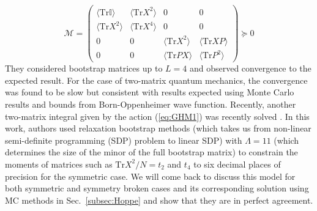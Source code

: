 \documentclass[letter,11pt]{article}
\begin{document}
\begin{equation}
	\mathcal{M} = 
	\begin{pmatrix}
		\langle \mbox{Tr}\mathbb{I} \rangle & \langle \mbox{Tr} X^2 \rangle & 0 & 0 \\
		\langle \mbox{Tr} X^2 \rangle & \langle \mbox{Tr} X^4 \rangle  & 0 & 0 \\ 
		0 & 0 & \langle \mbox{Tr} X^2 \rangle & \langle \mbox{Tr} XP \rangle \\
		0 & 0  & \langle \mbox{Tr} PX \rangle & \langle \mbox{Tr} P^2 \rangle
	\end{pmatrix}  \succeq 0
\end{equation}
They considered bootstrap matrices up to $L=4$ and observed
convergence to the expected result. 
For the case of two-matrix quantum mechanics, the convergence
was found to be slow but consistent with results expected using Monte Carlo results and bounds from Born-Oppenheimer wave function. Recently, another two-matrix integral given by the action (\ref{eq:GHM1}) was recently solved \cite{Kazakov:2021lel}. 
In this work, authors used relaxation bootstrap methods (which takes us 
from non-linear semi-definite programming (SDP) problem to linear SDP) with
$\Lambda=11$ (which determines the size of the minor of the full bootstrap matrix) 
to constrain the moments of matrices such as $\mathrm{Tr}X^2/N = t_{2}$ and $t_{4}$ 
to six decimal places of precision for the symmetric case. We will come back to 
discuss this model for both symmetric and symmetry broken cases 
and its corresponding solution using MC methods in Sec.~\ref{subsec:Hoppe} 
and show that they are in perfect agreement.  
\end{document}

